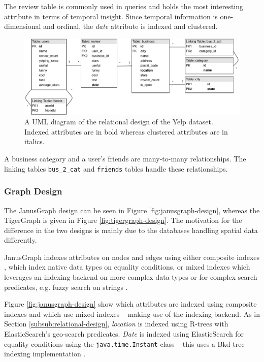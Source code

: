 The review table is commonly used in queries and holds the most interesting attribute in terms of temporal insight. Since temporal information is one-dimensional and ordinal, the \emph{date} attribute is indexed and clustered.

\begin{figure}[h]
    \centering
    \includegraphics[width=16cm]{img/relational-design.pdf}
    \caption{A UML diagram of the relational design of the Yelp dataset. Indexed attributes are in bold whereas clustered attributes are in italics.}
    \label{fig:relational-design}
\end{figure}

A business category and a user's friends are many-to-many relationships. The linking tables \texttt{bus\_2\_cat} and \texttt{friends} tables handle these relationships.

\subsubsection{Graph Design}

The JanusGraph design can be seen in Figure \ref{fig:janusgraph-design}, whereas the TigerGraph is given in Figure \ref{fig:tigergraph-design}. The motivation for the difference in the two designs is mainly due to the databases handling spatial data differently.

JanusGraph indexes attributes on nodes and edges using either composite indexes \cite{janusgraph-comp-index}, which index native data types on equality conditions, or mixed indexes which leverages an indexing backend on more complex data types or for complex search predicates, e.g. fuzzy search on strings \cite{janusgraph-mixed-index}.

Figure \ref{fig:janusgraph-design} show which attributes are indexed using composite indexes and which use mixed indexes -- making use of the indexing backend. As in Section \ref{subsub:relational-design}, \emph{location} is indexed using R-trees with ElasticSearch's geo-search predicates. \emph{Date} is indexed using ElasticSearch for equality conditions using the \texttt{java.time.Instant} class -- this uses a Bkd-tree indexing implementation \cite{es-bkdtree-index}.

